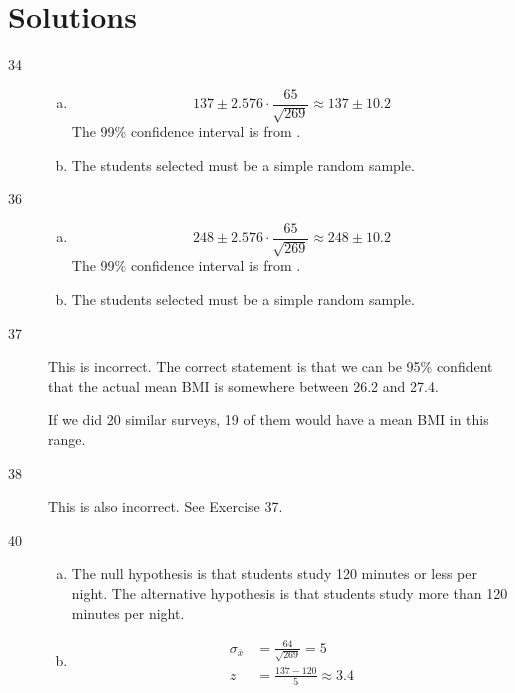 \documentclass[letterpaper, landscape]{exam}
\begin{document}
    \section{Solutions}
    \begin{description}

      \item[34] 
        \begin{enumerate}[(a)]
          \item 
            \[
              137 \pm 2.576 \cdot \frac{65}{\sqrt{269}} \approx 137 \pm 10.2
            \]
            The 99\% confidence interval is from .

          \item The students selected must be a simple random sample.

        \end{enumerate}

      \item[36] 
        \begin{enumerate}[(a)]
          \item 
            \[
              248 \pm 2.576 \cdot \frac{65}{\sqrt{269}} \approx 248 \pm 10.2
            \]
            The 99\% confidence interval is from .

          \item The students selected must be a simple random sample.

        \end{enumerate}

      \item[37] This is incorrect. The correct statement is that we can be 95\%
        confident that the actual mean BMI is somewhere between 26.2 and 27.4.

        If we did 20 similar surveys, 19 of them would have a mean BMI in this
        range.

      \item[38] This is also incorrect. See Exercise 37.

      \item[40]
        \begin{enumerate}[(a)]
          \item The null hypothesis is that students study 120 minutes or less
            per night. The alternative hypothesis is that students study more
            than 120 minutes per night.

          \item
            \begin{align*}
              \sigma_{\bar{x}} & = \frac{64}{\sqrt{269}} = 5 \\
              z                & = \frac{137 - 120}{5} \approx 3.4
            \end{align*}


\end{enumerate}
\end{description}
\end{document}
